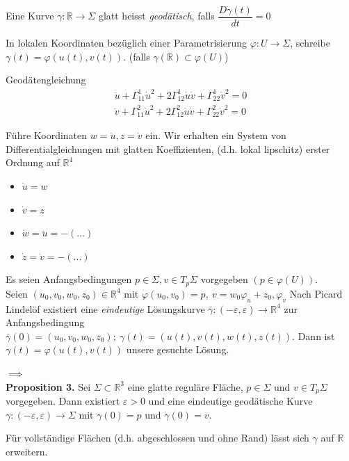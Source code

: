 \documentclass[../main.tex]{subfiles}
\begin{document}

\begin{recall}
    Eine Kurve $\gamma : \mathbb{R} \to \Sigma$ glatt heisst \emph{geodätisch}, falls
$\dfrac{D\dot{\gamma}(t)}{dt}=0$
\end{recall}

In lokalen Koordinaten bezüglich einer Parametrisierung
$\varphi : U \to \Sigma$, schreibe \\ $\gamma (t) = \varphi(u(t),v(t))$.
(falls $\gamma(\mathbb{R}) \subset \varphi(U)$)

Geodätengleichung
\begin{align*}
    \ddot{u} + \Gamma^1_{11}\dot{u}^2 + 2 \Gamma^1_{12}\dot{u}\dot{v} + \Gamma^1_{22}\dot{v}^2 = 0 \\
    \ddot{v} + \Gamma^2_{11}\dot{u}^2 + 2 \Gamma^2_{12}\dot{u}\dot{v} + \Gamma^2_{22}\dot{v}^2 = 0 
\end{align*}

Führe Koordinaten $w=\dot{u}, z=\dot{v}$ ein. Wir erhalten ein System von Differentialgleichungen 
mit glatten Koeffizienten, (d.h. lokal lipschitz) erster Ordnung auf $\mathbb{R}^4$
\begin{itemize}
    \item $\dot{u} = w$
    \item $\dot{v} = z$
    \item $\dot{w} = \ddot{u} = -(...)$
    \item $\dot{z} = \ddot{v} = -(...)$
\end{itemize}

Es seien Anfangsbedingungen $p \in \Sigma, v \in T_p\Sigma$ vorgegeben $(p\in \varphi(U))$. \\
Seien $(u_0,v_0,w_0,z_0) \in \mathbb{R}^4$ mit $\varphi(u_0,v_0) = p, \  v = w_0\varphi_u+z_0,\varphi_v$
Nach Picard Lindelöf existiert eine \emph{eindeutige} Lösungskurve
$\bar{\gamma}: (-\varepsilon,\varepsilon) \to \mathbb{R}^4$ zur Anfangsbedingung $\bar{\gamma}(0)=(u_0,v_0,w_0,z_0); \ \gamma(t)=(u(t),v(t),w(t),z(t))$.
Dann ist $\gamma(t) = \varphi(u(t),v(t))$ unsere gesuchte Lösung.

$\implies$ \\
\textbf{Proposition 3.} Sei $\Sigma \subset \mathbb{R}^3$ eine glatte reguläre Fläche, $p \in \Sigma$
und $v\in T_p\Sigma$ vorgegeben. Dann existiert $\varepsilon >0$ und eine 
eindeutige geodätische Kurve $\gamma : (-\varepsilon, \varepsilon)\to \Sigma$ mit $\gamma(0)=p$
und $\dot{\gamma}(0)=v$.

\begin{zusatz}
    Für vollständige Flächen (d.h. abgeschlossen und ohne Rand) lässt sich
    $\gamma$ auf $\mathbb{R}$ erweitern.
\end{zusatz}
\end{document}

